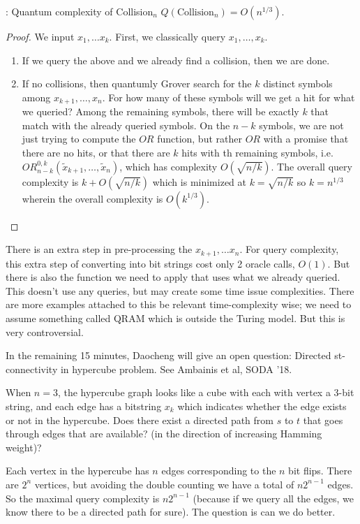 \begin{propbox}{: Quantum complexity of Collision$_n$}
    $Q(\text{Collision}_n) = O(n^{1/3})$.
\end{propbox}
\begin{proof}
    We input $x_1, \ldots x_k$. First, we classically query $x_1, \ldots, x_k$.

    \begin{enumerate}
        \item If we query the above and we already find a collision, then we are done.
        \item If no collisions, then quantumly Grover search for the $k$ distinct symbols among $x_{k+1}, \ldots, x_n$. For how many of these symbols will we get a hit for what we queried? Among the remaining symbols, there will be exactly $k$ that match with the already queried symbols. On the $n-k$ symbols, we are not just trying to compute the $OR$ function, but rather $OR$ with a promise that there are no hits, or that there are $k$ hits with th remaining symbols, i.e. $OR^{0, k}_{n-k}(\tilde{x}_{k+1}, \ldots, \tilde{x}_n)$, which has complexity $O(\sqrt{n/k})$. The overall query complexity is $k + O(\sqrt{n/k})$ which is minimized at $k = \sqrt{n/k}$ so $k = n^{1/3}$ wherein the overall complexity is $O(k^{1/3})$.
    \end{enumerate}

\end{proof}
There is an extra step in pre-processing the $x_{k+1}, \ldots x_n$. For query complexity, this extra step of converting into bit strings cost only 2 oracle calls, $O(1)$. But there is also the function we need to apply that uses what we already queried. This doesn't use any queries, but may create some time issue complexities. There are more examples attached to this be relevant time-complexity wise; we need to assume something called QRAM which is outside the Turing model. But this is very controversial.

In the remaining 15 minutes, Daocheng will give an open question: Directed st-connectivity in hypercube problem.  See Ambainis et al, SODA '18.

When $n = 3$, the hypercube graph looks like a cube with each with vertex a 3-bit string, and each edge has a bitstring $x_k$ which indicates whether the edge exists or not in the hypercube. Does there exist a directed path from $s$ to $t$ that goes through edges that are available? (in the direction of increasing Hamming weight)?

Each vertex in the hypercube has $n$ edges corresponding to the $n$ bit flips. There are $2^n$ vertices, but avoiding the double counting we have a total of $n2^{n-1}$ edges. So the maximal query complexity is $n2^{n-1}$ (because if we query all the edges, we know there to be a directed path for sure). The question is can we do better.

